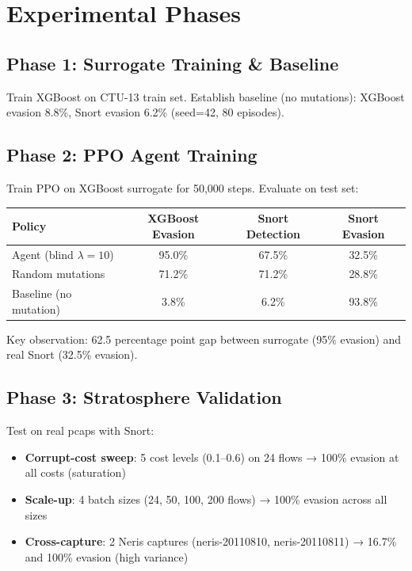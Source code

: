 \documentclass[12pt,a4paper]{report}
\begin{document}
\section{Experimental Phases}

\subsection{Phase 1: Surrogate Training \& Baseline}

Train XGBoost on CTU-13 train set. Establish baseline (no mutations): XGBoost evasion 8.8\%, Snort evasion 6.2\% (seed=42, 80 episodes).

\subsection{Phase 2: PPO Agent Training}

Train PPO on XGBoost surrogate for 50,000 steps. Evaluate on test set:

\begin{table}[h]
\centering
\begin{tabular}{l|c|c|c}
Policy & XGBoost Evasion & Snort Detection & Snort Evasion \\
\hline
Agent (blind $\lambda=10$) & 95.0\% & 67.5\% & 32.5\% \\
Random mutations & 71.2\% & 71.2\% & 28.8\% \\
Baseline (no mutation) & 3.8\% & 6.2\% & 93.8\% \\
\end{tabular}
\end{table}

Key observation: 62.5 percentage point gap between surrogate (95\% evasion) and real Snort (32.5\% evasion).

\subsection{Phase 3: Stratosphere Validation}

Test on real pcaps with Snort:

\begin{itemize}
  \item \textbf{Corrupt-cost sweep}: 5 cost levels (0.1–0.6) on 24 flows → 100\% evasion at all costs (saturation)
  \item \textbf{Scale-up}: 4 batch sizes (24, 50, 100, 200 flows) → 100\% evasion across all sizes
  \item \textbf{Cross-capture}: 2 Neris captures (neris-20110810, neris-20110811) → 16.7\% and 100\% evasion (high variance)
\end{itemize}
\end{document}
